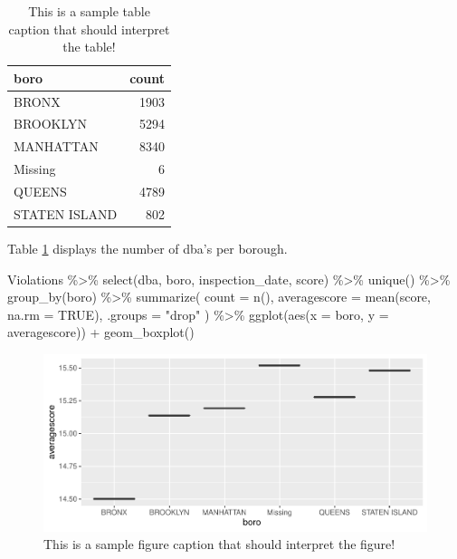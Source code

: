 \documentclass[12pt]{article}
\newenvironment{Shaded}{\begin{snugshade}}{\end{snugshade}}
\newcommand{\AttributeTok}[1]{\textcolor[rgb]{0.77,0.63,0.00}{#1}}
\newcommand{\ConstantTok}[1]{\textcolor[rgb]{0.00,0.00,0.00}{#1}}
\newcommand{\FunctionTok}[1]{\textcolor[rgb]{0.00,0.00,0.00}{#1}}
\newcommand{\NormalTok}[1]{#1}
\newcommand{\SpecialCharTok}[1]{\textcolor[rgb]{0.00,0.00,0.00}{#1}}
\newcommand{\StringTok}[1]{\textcolor[rgb]{0.31,0.60,0.02}{#1}}
\begin{document}
\begin{table}

\caption{\label{tab:sample-table1}This is a sample table caption that should interpret the table!}
\centering
\begin{tabular}[t]{l|r}
\hline
boro & count\\
\hline
BRONX & 1903\\
\hline
BROOKLYN & 5294\\
\hline
MANHATTAN & 8340\\
\hline
Missing & 6\\
\hline
QUEENS & 4789\\
\hline
STATEN ISLAND & 802\\
\hline
\end{tabular}
\end{table}

Table \ref{tab:sample-table1} displays the number of dba's per borough.

\begin{Shaded}
\begin{Highlighting}[]
\NormalTok{Violations }\SpecialCharTok{\%\textgreater{}\%}
  \FunctionTok{select}\NormalTok{(dba, boro, inspection\_date, score) }\SpecialCharTok{\%\textgreater{}\%}
  \FunctionTok{unique}\NormalTok{() }\SpecialCharTok{\%\textgreater{}\%}
  \FunctionTok{group\_by}\NormalTok{(boro) }\SpecialCharTok{\%\textgreater{}\%}
  \FunctionTok{summarize}\NormalTok{(}
    \AttributeTok{count =} \FunctionTok{n}\NormalTok{(),}
    \AttributeTok{averagescore =} \FunctionTok{mean}\NormalTok{(score, }\AttributeTok{na.rm =} \ConstantTok{TRUE}\NormalTok{),}
    \AttributeTok{.groups =} \StringTok{"drop"}
\NormalTok{  ) }\SpecialCharTok{\%\textgreater{}\%}
  \FunctionTok{ggplot}\NormalTok{(}\FunctionTok{aes}\NormalTok{(}\AttributeTok{x =}\NormalTok{ boro, }\AttributeTok{y =}\NormalTok{ averagescore)) }\SpecialCharTok{+}
  \FunctionTok{geom\_boxplot}\NormalTok{()}
\end{Highlighting}
\end{Shaded}

\begin{figure}
\centering
\includegraphics{paper_files/figure-latex/sample-fig1-1.pdf}
\caption{\label{fig:sample-fig1}This is a sample figure caption that
should interpret the figure!}
\end{figure}
\end{document}
